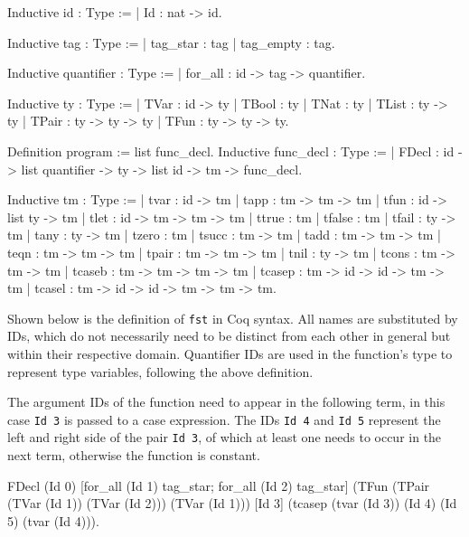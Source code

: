 \documentclass[paper = a4, fleqn, twoside]{scrreprt}
\newcommand{\coqinline}[1]{\texttt{#1}}
\begin{document}
\begin{flushleft}
\begin{minipage}[t]{.45 \linewidth}
\begin{coqcode}
Inductive id : Type :=
  | Id : nat -> id.

Inductive tag : Type :=
  | tag_star  : tag
  | tag_empty : tag.

Inductive quantifier : Type :=
  | for_all : id -> tag -> quantifier.

Inductive ty : Type :=
  | TVar  : id -> ty
  | TBool : ty
  | TNat  : ty
  | TList : ty -> ty
  | TPair : ty -> ty -> ty
  | TFun  : ty -> ty -> ty.

Definition program := list func_decl.
Inductive func_decl : Type :=
  | FDecl : id -> list quantifier ->
    ty -> list id -> tm -> func_decl.
\end{coqcode}
\end{minipage}
\hfill
\vrule
\vspace{.5 em}
\begin{minipage}[t]{.5 \linewidth}
	\begin{coqcode}
Inductive tm : Type :=
  | tvar   : id -> tm
  | tapp   : tm -> tm -> tm
  | tfun   : id -> list ty -> tm
  | tlet   : id -> tm -> tm -> tm
  | ttrue  : tm
  | tfalse : tm
  | tfail  : ty -> tm
  | tany   : ty -> tm
  | tzero  : tm
  | tsucc  : tm -> tm
  | tadd   : tm -> tm -> tm
  | teqn   : tm -> tm -> tm
  | tpair  : tm -> tm -> tm
  | tnil   : ty -> tm
  | tcons  : tm -> tm -> tm
  | tcaseb : tm -> tm -> tm -> tm
  | tcasep : tm -> id -> id -> tm ->
             tm
  | tcasel : tm -> id -> id -> tm ->
             tm -> tm.
	\end{coqcode}
\end{minipage}
\end{flushleft}\noindent
Shown below is the definition of \texttt{fst} in Coq syntax. All names are substituted by IDs, which do not necessarily need to be distinct from each other in general but within their respective domain. Quantifier IDs are used in the function's type to represent type variables, following the above definition. \par 
The argument IDs of the function need to appear in the following term, in this case \coqinline{Id 3} is passed to a case expression. The IDs \coqinline{Id 4} and \coqinline{Id 5} represent the left and right side of the pair \coqinline{Id 3}, of which at least one needs to occur in the next term, otherwise the function is constant.
\begin{coqcode}
FDecl (Id 0) 
      [for_all (Id 1) tag_star; for_all (Id 2) tag_star] 
      (TFun (TPair (TVar (Id 1)) (TVar (Id 2))) (TVar (Id 1)))
      [Id 3]
      (tcasep (tvar (Id 3)) (Id 4) (Id 5) (tvar (Id 4))).
\end{coqcode}
\end{document}
